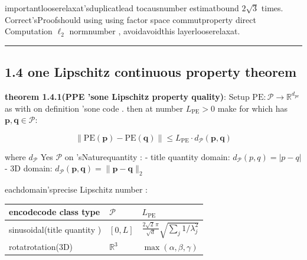 \documentclass[
  12pt,
]{article}
\begin{document}
importantlooserelaxat'sduplicatlead tocausnumber estimatbound \(2\sqrt{3}\)
times. Correct'sProofshould using using factor space  commutproperty direct Computation \(\ell_2\)
normnumber , avoidavoidthis layerlooserelaxat. 

\begin{center}\rule{0.5\linewidth}{0.5pt}\end{center}

\subsection{1.4 one  Lipschitz
continuous property theorem }\label{ux7edfux4e00-lipschitz-ux8fdeux7eedux6027ux5b9aux7406}

\textbf{theorem  1.4.1(PPE 'sone  Lipschitz property quality)}: Setup
\(\text{PE}: \mathcal{P} \to \mathbb{R}^{d_{\text{pe}}}\)
as with on definition 'sone code . then at number  \(L_{\text{PE}} > 0\) make for which has 
\(\mathbf{p}, \mathbf{q} \in \mathcal{P}\): 

\[\|\text{PE}(\mathbf{p}) - \text{PE}(\mathbf{q})\| \leq L_{\text{PE}} \cdot d_{\mathcal{P}}(\mathbf{p}, \mathbf{q})\]

where \(d_{\mathcal{P}}\) Yes \(\mathcal{P}\) on 'sNaturequantity :  -
title quantity domain: \(d_{\mathcal{P}}(p, q) = |p - q|\) - 3D
domain: \(d_{\mathcal{P}}(\mathbf{p}, \mathbf{q}) = \|\mathbf{p} - \mathbf{q}\|_2\)

eachdomain'sprecise  Lipschitz number : 

\begin{longtable}[]{@{}
  >{\raggedright\arraybackslash}p{}
  >{\raggedright\arraybackslash}p{}
  >{\raggedright\arraybackslash}p{}@{}}
\toprule\noalign{}
\begin{minipage}[b]{\linewidth}\raggedright
encodecode class type 
\end{minipage} & \begin{minipage}[b]{\linewidth}\raggedright
\(\mathcal{P}\)
\end{minipage} & \begin{minipage}[b]{\linewidth}\raggedright
\(L_{\text{PE}}\)
\end{minipage} \\
\midrule\noalign{}
\endhead
\bottomrule\noalign{}
\endlastfoot
 sinusoidal(title quantity ) & \([0, L]\) &
\(\frac{2\sqrt{2}\,\pi}{\sqrt{d}}\sqrt{\sum_j 1/\lambda_j^2}\) \\
rotatrotation(3D) & \(\mathbb{R}^3\) & \(\max(\alpha, \beta, \gamma)\) \\
\end{longtable}
\end{document}
